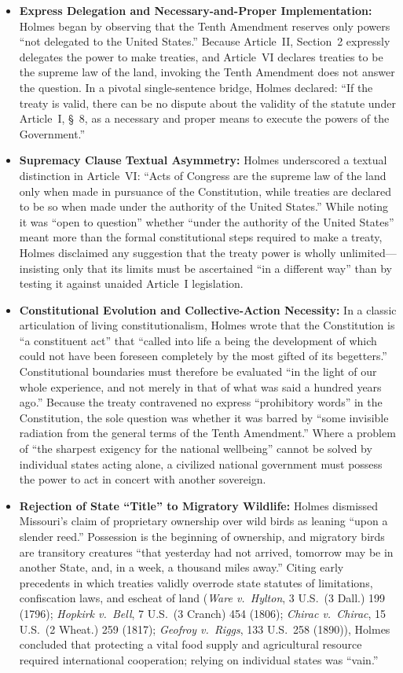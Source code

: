 \documentclass[12pt]{article}
\begin{document}
\begin{itemize}
  \item \textbf{Express Delegation and Necessary-and-Proper Implementation:} Holmes began by observing that the Tenth Amendment reserves only powers ``not delegated to the United States.'' Because Article~II, Section~2 expressly delegates the power to make treaties, and Article~VI declares treaties to be the supreme law of the land, invoking the Tenth Amendment does not answer the question. In a pivotal single-sentence bridge, Holmes declared: ``If the treaty is valid, there can be no dispute about the validity of the statute under Article~I, \S~8, as a necessary and proper means to execute the powers of the Government.''
  \item \textbf{Supremacy Clause Textual Asymmetry:} Holmes underscored a textual distinction in Article~VI: ``Acts of Congress are the supreme law of the land only when made in pursuance of the Constitution, while treaties are declared to be so when made under the authority of the United States.'' While noting it was ``open to question'' whether ``under the authority of the United States'' meant more than the formal constitutional steps required to make a treaty, Holmes disclaimed any suggestion that the treaty power is wholly unlimited---insisting only that its limits must be ascertained ``in a different way'' than by testing it against unaided Article~I legislation.
  \item \textbf{Constitutional Evolution and Collective-Action Necessity:} In a classic articulation of living constitutionalism, Holmes wrote that the Constitution is ``a constituent act'' that ``called into life a being the development of which could not have been foreseen completely by the most gifted of its begetters.'' Constitutional boundaries must therefore be evaluated ``in the light of our whole experience, and not merely in that of what was said a hundred years ago.'' Because the treaty contravened no express ``prohibitory words'' in the Constitution, the sole question was whether it was barred by ``some invisible radiation from the general terms of the Tenth Amendment.'' Where a problem of ``the sharpest exigency for the national wellbeing'' cannot be solved by individual states acting alone, a civilized national government must possess the power to act in concert with another sovereign.
  \item \textbf{Rejection of State ``Title'' to Migratory Wildlife:} Holmes dismissed Missouri's claim of proprietary ownership over wild birds as leaning ``upon a slender reed.'' Possession is the beginning of ownership, and migratory birds are transitory creatures ``that yesterday had not arrived, tomorrow may be in another State, and, in a week, a thousand miles away.'' Citing early precedents in which treaties validly overrode state statutes of limitations, confiscation laws, and escheat of land (\textit{Ware v.\ Hylton}, 3 U.S.\ (3 Dall.) 199 (1796); \textit{Hopkirk v.\ Bell}, 7 U.S.\ (3 Cranch) 454 (1806); \textit{Chirac v.\ Chirac}, 15 U.S.\ (2 Wheat.) 259 (1817); \textit{Geofroy v.\ Riggs}, 133 U.S.\ 258 (1890)), Holmes concluded that protecting a vital food supply and agricultural resource required international cooperation; relying on individual states was ``vain.''

\end{itemize}
\end{document}
